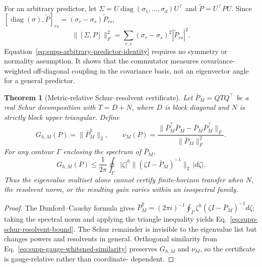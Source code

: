 \documentclass{article}
\newtheorem{supptheorem}{Theorem}
\begin{document}
For an arbitrary predictor, let
$\Sigma=U\operatorname{diag}(\sigma_1,\ldots,\sigma_d)U^\top$ and
$\widetilde P=U^\top P U$. Since
$[\operatorname{diag}(\sigma),\widetilde P]_{rs}
=(\sigma_r-\sigma_s)\widetilde P_{rs}$,
\begin{equation}
\label{eq:supp-arbitrary-predictor-identity}
\|[\Sigma,P]\|_F^2
=\sum_{r,s}(\sigma_r-\sigma_s)^2|\widetilde P_{rs}|^2.
\end{equation}
Equation~\eqref{eq:supp-arbitrary-predictor-identity} requires no symmetry or
normality assumption. It shows that the commutator measures covariance-weighted
off-diagonal coupling in the covariance basis, not an eigenvector angle for a
general predictor.

\begin{supptheorem}[Metric-relative Schur--resolvent certificate]
\label{thm:supp-schur-resolvent}
Let $\bar P_M=Q TQ^\top$ be a real Schur decomposition with
$T=D+N$, where $D$ is block diagonal and $N$ is strictly block upper
triangular. Define
\begin{equation}
\label{eq:supp-schur-gain}
G_{h,M}(P)=\|\bar P_M^h\|_2,\qquad
\nu_M(P)=\frac{\|\bar P_M^\top\bar P_M-
\bar P_M\bar P_M^\top\|_F}{\|\bar P_M\|_F^2}.
\end{equation}
For any contour $\Gamma$ enclosing the spectrum of $\bar P_M$,
\begin{equation}
\label{eq:supp-schur-resolvent-bound}
G_{h,M}(P)\leq \frac{1}{2\pi}\oint_\Gamma
|\zeta|^h\|(\zeta I-\bar P_M)^{-1}\|_2\,|d\zeta|.
\end{equation}
Thus the eigenvalue multiset alone cannot certify finite-horizon transfer
when $N$, the resolvent norm, or the resulting gain varies within an
isospectral family.
\end{supptheorem}

\begin{proof}
The Dunford--Cauchy formula gives
$\bar P_M^h=(2\pi i)^{-1}\oint_\Gamma
\zeta^h(\zeta I-\bar P_M)^{-1}d\zeta$; taking the spectral norm and applying
the triangle inequality yields Eq.~\eqref{eq:supp-schur-resolvent-bound}.
The Schur remainder is invisible to the eigenvalue list but changes powers
and resolvents in general. Orthogonal similarity from
Eq.~\eqref{eq:supp-gauge-whitened-similarity} preserves $G_{h,M}$ and
$\nu_M$, so the certificate is gauge-relative rather than coordinate-
dependent.
\end{proof}
\end{document}
